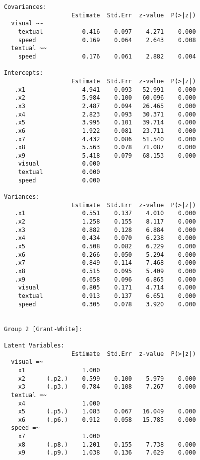 \begin{verbatim}
Covariances:
                   Estimate  Std.Err  z-value  P(>|z|)
  visual ~~                                           
    textual           0.416    0.097    4.271    0.000
    speed             0.169    0.064    2.643    0.008
  textual ~~                                          
    speed             0.176    0.061    2.882    0.004

Intercepts:
                   Estimate  Std.Err  z-value  P(>|z|)
   .x1                4.941    0.093   52.991    0.000
   .x2                5.984    0.100   60.096    0.000
   .x3                2.487    0.094   26.465    0.000
   .x4                2.823    0.093   30.371    0.000
   .x5                3.995    0.101   39.714    0.000
   .x6                1.922    0.081   23.711    0.000
   .x7                4.432    0.086   51.540    0.000
   .x8                5.563    0.078   71.087    0.000
   .x9                5.418    0.079   68.153    0.000
    visual            0.000                           
    textual           0.000                           
    speed             0.000                           

Variances:
                   Estimate  Std.Err  z-value  P(>|z|)
   .x1                0.551    0.137    4.010    0.000
   .x2                1.258    0.155    8.117    0.000
   .x3                0.882    0.128    6.884    0.000
   .x4                0.434    0.070    6.238    0.000
   .x5                0.508    0.082    6.229    0.000
   .x6                0.266    0.050    5.294    0.000
   .x7                0.849    0.114    7.468    0.000
   .x8                0.515    0.095    5.409    0.000
   .x9                0.658    0.096    6.865    0.000
    visual            0.805    0.171    4.714    0.000
    textual           0.913    0.137    6.651    0.000
    speed             0.305    0.078    3.920    0.000


Group 2 [Grant-White]:

Latent Variables:
                   Estimate  Std.Err  z-value  P(>|z|)
  visual =~                                           
    x1                1.000                           
    x2      (.p2.)    0.599    0.100    5.979    0.000
    x3      (.p3.)    0.784    0.108    7.267    0.000
  textual =~                                          
    x4                1.000                           
    x5      (.p5.)    1.083    0.067   16.049    0.000
    x6      (.p6.)    0.912    0.058   15.785    0.000
  speed =~                                            
    x7                1.000                           
    x8      (.p8.)    1.201    0.155    7.738    0.000
    x9      (.p9.)    1.038    0.136    7.629    0.000


\end{verbatim}
